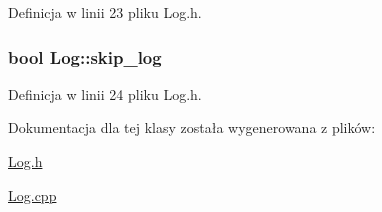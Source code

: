 \-Definicja w linii 23 pliku \-Log.\-h.

\hypertarget{class_log_a463353fa3f565307672939857d2ad2a3}{
\subsubsection[{skip\-\_\-log}]{\setlength{\rightskip}{0pt plus 5cm}bool {\bf \-Log\-::skip\-\_\-log}}}\label{class_log_a463353fa3f565307672939857d2ad2a3}


\-Definicja w linii 24 pliku \-Log.\-h.



\-Dokumentacja dla tej klasy została wygenerowana z plików\-:\begin{DoxyCompactItemize}
\item 
\hyperlink{_log_8h}{\-Log.\-h}\item 
\hyperlink{_log_8cpp}{\-Log.\-cpp}\end{DoxyCompactItemize}
